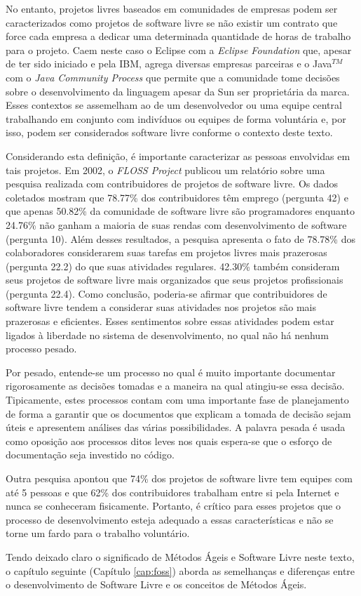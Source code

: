 No entanto, projetos livres baseados em comunidades de empresas podem
ser caracterizados como projetos de software livre se não existir um
contrato que force cada empresa a dedicar uma determinada quantidade
de horas de trabalho para o projeto. Caem neste caso o Eclipse com a
\emph{Eclipse Foundation} que, apesar de ter sido iniciado e pela IBM,
agrega diversas empresas parceiras e o Java$^{TM}$ com o \emph{Java Community
  Process} que permite que a comunidade tome decisões sobre o
desenvolvimento da linguagem apesar da Sun ser proprietária da
marca. Esses contextos se assemelham ao de um desenvolvedor ou uma
equipe central trabalhando em conjunto com indivíduos ou equipes de
forma voluntária e, por isso, podem ser considerados software livre
conforme o contexto deste texto.

Considerando esta definição, é importante caracterizar as pessoas
envolvidas em tais projetos. Em 2002, o \emph{FLOSS Project}
\cite{FlossProject} publicou um relatório sobre uma pesquisa realizada
com contribuidores de projetos de software livre. Os dados coletados
\cite{FlossStats} mostram que 78.77\% dos contribuidores têm emprego
(pergunta 42) e que apenas 50.82\% da comunidade de software livre são
programadores enquanto 24.76\% não ganham a maioria de suas rendas com
desenvolvimento de software (pergunta 10). Além desses resultados, a
pesquisa apresenta o fato de 78.78\% dos colaboradores considerarem
suas tarefas em projetos livres mais prazerosas (pergunta 22.2) do que
suas atividades regulares. 42.30\% também consideram seus projetos de
software livre mais organizados que seus projetos profissionais
(pergunta 22.4). Como conclusão, poderia-se afirmar que contribuidores
de software livre tendem a considerar suas atividades nos projetos são
mais prazerosas e eficientes. Esses sentimentos sobre essas atividades
podem estar ligados à liberdade no sistema de desenvolvimento, no qual
não há nenhum processo pesado.

Por pesado, entende-se um processo no qual é muito importante
documentar rigorosamente as decisões tomadas e a maneira na qual
atingiu-se essa decisão. Tipicamente, estes processos contam com uma
importante fase de planejamento de forma a garantir que os documentos
que explicam a tomada de decisão sejam úteis e apresentem análises das
várias possibilidades. A palavra pesada é usada como oposição aos
processos ditos leves nos quais espera-se que o esforço de
documentação seja investido no código. %

Outra pesquisa \cite{Reis2003} apontou que 74\% dos projetos de
software livre tem equipes com até 5 pessoas e que 62\% dos
contribuidores trabalham entre si pela Internet e nunca se conheceram
fisicamente. Portanto, é crítico para esses projetos que o processo de
desenvolvimento esteja adequado a essas características e não se torne
um fardo para o trabalho voluntário.

Tendo deixado claro o significado de Métodos Ágeis e Software Livre
neste texto, o capítulo seguinte (Capítulo \ref{cap:foss})
aborda as semelhanças e diferenças entre o desenvolvimento de Software
Livre e os conceitos de Métodos Ágeis.

